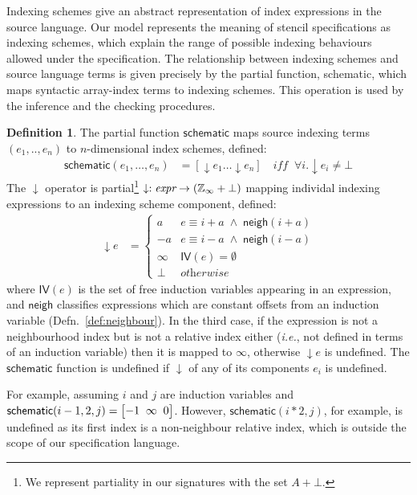 \documentclass[9pt]{sigplanconf}
\newcounter{block}
\theoremstyle{definition}
\newtheorem{definition}[block]{Definition}
\newcommand{\ie}{\emph{i.e.}}
\newcommand{\neigh}{\textsf{neigh}}
\newcommand{\vthreeh}[3]{\setlength{\arraycolsep}{0em}
\left[\begin{array}{ccc}#1 \; & \; #2 \; & \; #3\end{array}\right]}
\begin{document}
Indexing schemes give an abstract
representation of index expressions in the source language.
Our model represents the meaning of stencil specifications
as indexing schemes, which explain the range of possible
indexing behaviours allowed under the specification.
The relationship between indexing schemes and source language
terms is given precisely by the partial function, \textsf{schematic}, which
maps syntactic array-index terms to indexing schemes. This
operation is used by the inference
and the checking procedures.

\begin{definition}%
\label{def:schematic}
The partial function $\textsf{schematic}$ maps
source indexing terms $(e_1, .., e_n)$
to $n$-dimensional index schemes, defined:
%
\begin{align*}
\mathsf{schematic}(e_1, \ldots, e_n) & =
[\downarrow\!e_1 \ldots \downarrow\!e_n ]
\quad \textit{iff} \;\; \forall i . \downarrow\!e_i \neq \bot
\end{align*}
%
The $\downarrow$ operator is partial\footnote{We represent
  partiality in our signatures with the set $A + \bot$.} 
 $\downarrow : \textit{expr} \rightarrow (\mathbb{Z}_\infty + \bot)$
mapping individal indexing expressions to 
an indexing scheme component, defined:
\begin{align*}
\downarrow\!e
 & =  \begin{cases}
a & e \equiv i + a \; \wedge \; \mathsf{neigh}(i + a) \\
-a & e \equiv i - a \; \wedge \; \mathsf{neigh}(i - a) \\
\infty & \textit{$\mathsf{IV}(e) = \emptyset$} \\
\bot   & \textit{otherwise}
\end{cases}
\end{align*}
where $\mathsf{IV}(e)$ is the set of free induction variables
appearing in an expression, and $\neigh{}$ classifies expressions which
are constant offsets from an induction variable
(Defn.~\ref{def:neighbour}). In the third case,
if the expression is not a neighbourhood index but is not
a relative index either (\ie{}, not defined in terms
of an induction variable) then it is mapped to $\infty$, otherwise
$\downarrow\!e$ is undefined. The $\mathsf{schematic}$ function
is undefined if $\downarrow$ of any of its components $e_i$ is
undefined.

For example, assuming $i$ and $j$ are induction variables and $\textsf{schematic}(i-1, 2, j)
 = \vthreeh{-1}{\infty}{0}$. However, $\textsf{schematic}(i*2, j)$, for
 example, is
 undefined as its first index is a non-neighbour relative index, which
 is outside the scope of our specification language.
\end{definition}
\end{document}
